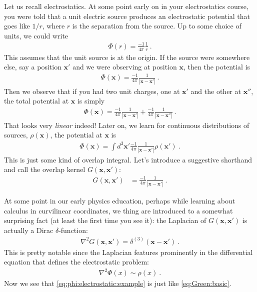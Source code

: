 \documentclass[12pt]{article}
\numberwithin{equation}{section}    %
\renewcommand{\vec}[1]{\mathbf{#1}} %
\begin{document}
Let us recall electrostatics. At some point early on in your electrostatics course, you were told that a unit electric source produces an electrostatic potential that goes like $1/r$, where $r$ is the separation from the source. Up to some choice of units, we could write
\begin{align}
  \Phi(r) = \frac{-1}{4\pi}\frac{1}{r} \ .
\end{align}
This assumes that the unit source is at the origin. If the source were somewhere else, say a position $\vec{x'}$ and we were observing at position $\vec{x}$, then the potential is
\begin{align}
  \Phi(\vec{x}) = \frac{-1}{4\pi}\frac{1}{|\vec{x}-\vec{x'}|} \ .
\end{align}
Then we observe that if you had two unit charges, one at $\vec{x'}$ and the other at $\vec{x''}$, the total potential at $\vec{x}$ is simply
\begin{align}
  \Phi(\vec{x}) = \frac{-1}{4\pi}\frac{1}{|\vec{x}-\vec{x'}|}
  + \frac{-1}{4\pi}\frac{1}{|\vec{x}-\vec{x''}|} \ .
\end{align}
That looks very \emph{linear} indeed! Later on, we learn for continuous distributions of sources, $\rho(\vec{x})$, the potential at $\vec{x}$ is
\begin{align}
  \Phi(\vec{x}) = \int d^3\vec{x'} \frac{-1}{4\pi}\frac{1}{|\vec{x}-\vec{x'}|} \rho(\vec{x}') \ .
  \label{eq:phi:electrostatic:example}
\end{align}
This is just some kind of overlap integral. Let’s introduce a suggestive shorthand and call the overlap kernel $G(\vec{x},\vec{x'})$:
\begin{align}
  G(\vec{x},\vec{x'}) &= \frac{-1}{4\pi}\frac{1}{|\vec{x}-\vec{x'}|}  \ .
\end{align}

At some point in our early physics education, perhaps while learning about calculus in curvilinear coordinates, we thing are introduced to a somewhat surprising fact (at least the first time you see it): the Laplacian of $G(\vec{x},\vec{x'})$ is actually a Dirac $\delta$-function:
\begin{align}
  \nabla^2 G(\vec{x},\vec{x'}) = \delta^{(3)}(\vec{x}-\vec{x'}) \ .
\end{align}
This is pretty notable since the Laplacian features prominently in the differential equation that defines the electrostatic problem:
\begin{align}
  \nabla^2 \Phi(x) \sim \rho(x) \ .
\end{align}
Now we see that \eqref{eq:phi:electrostatic:example} is just like \eqref{eq:Green:basic}.
\end{document}
